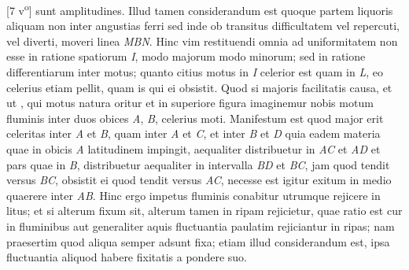 [7 v\textsuperscript{o}] sunt amplitudines. Illud tamen considerandum est quoque partem liquoris\protect{} aliquam non inter angustias ferri sed inde ob transitus difficultatem vel repercuti, vel diverti, moveri linea \textit{MBN}. Hinc  vim restituendi\protect{} omnia ad uniformitatem non esse in ratione spatiorum \textit{I}, modo majorum modo minorum; sed in ratione differentiarum inter motus; quanto citius motus in \textit{I} celerior est quam in \textit{L}, eo celerius etiam pellit, quam is qui ei obsistit. Quod si majoris facilitatis causa, et ut , qui  motus natura oritur et in superiore figura imaginemur nobis motum fluminis inter duos obices \textit{A}, \textit{B}, celerius moti.  %
                     Manifestum est quod major erit celeritas\protect{} inter \textit{A} et \textit{B}, quam inter \textit{A} et \textit{C}, et inter \textit{B} et \textit{D} quia eadem materia quae in obicis \textit{A} latitudinem impingit, aequaliter distribuetur in  \textit{AC} et \textit{AD} et pars quae in \textit{B}, distribuetur aequaliter in intervalla \textit{BD} et \textit{BC}, jam quod tendit versus \textit{BC}, obsistit ei quod tendit versus \textit{AC}, necesse est igitur exitum in medio quaerere inter \textit{AB}. Hinc ergo impetus\protect{} fluminis conabitur utrumque rejicere in litus; et si alterum fixum sit, alterum tamen in ripam rejicietur, quae ratio est cur in fluminibus aut generaliter aquis fluctuantia paulatim rejiciantur in ripas; nam praesertim quod aliqua semper adsunt fixa; etiam illud considerandum est, ipsa fluctuantia aliquod habere fixitatis a pondere suo.
